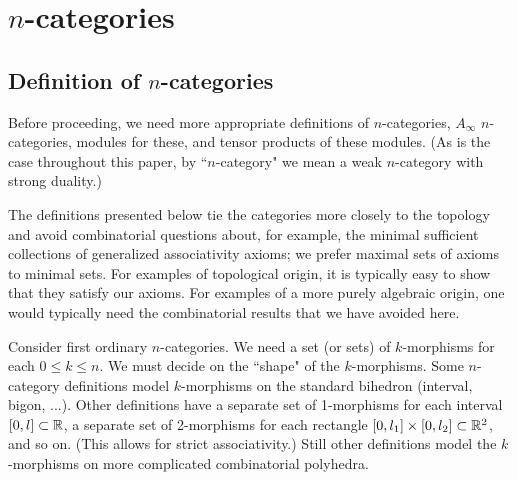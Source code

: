 
\def\xxpar#1#2{\smallskip\noindent{\bf #1} {\it #2} \smallskip}

\section{$n$-categories}
\label{sec:ncats}



\subsection{Definition of $n$-categories}

Before proceeding, we need more appropriate definitions of $n$-categories, 
$A_\infty$ $n$-categories, modules for these, and tensor products of these modules.
(As is the case throughout this paper, by ``$n$-category" we mean
a weak $n$-category with strong duality.)

The definitions presented below tie the categories more closely to the topology
and avoid combinatorial questions about, for example, the minimal sufficient
collections of generalized associativity axioms; we prefer maximal sets of axioms to minimal sets.
For examples of topological origin, it is typically easy to show that they
satisfy our axioms.
For examples of a more purely algebraic origin, one would typically need the combinatorial
results that we have avoided here.

\medskip

Consider first ordinary $n$-categories.
We need a set (or sets) of $k$-morphisms for each $0\le k \le n$.
We must decide on the ``shape" of the $k$-morphisms.
Some $n$-category definitions model $k$-morphisms on the standard bihedron (interval, bigon, ...).
Other definitions have a separate set of 1-morphisms for each interval $[0,l] \subset \mathbb{R}$, 
a separate set of 2-morphisms for each rectangle $[0,l_1]\times [0,l_2] \subset \mathbb{R}^2$,
and so on.
(This allows for strict associativity.)
Still other definitions 
model the $k$-morphisms on more complicated combinatorial polyhedra.

